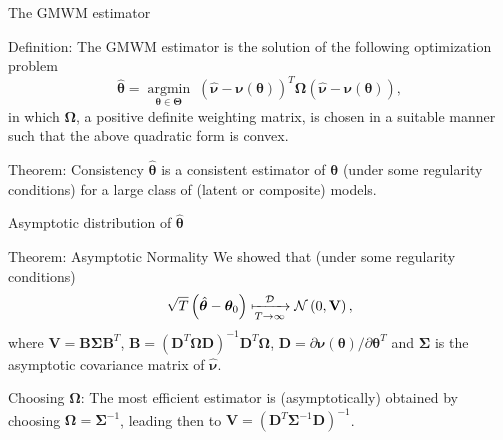 \documentclass[envcountsect,usenames,dvipsnames]{beamer}
\DeclareMathOperator*{\argmin}{argmin}
\theoremstyle{mystyle}
\begin{document}
\begin{frame}{The GMWM estimator}
		\begin{block}{Definition:}
			The GMWM estimator is the solution of the following optimization problem
			\begin{equation*}
			\hat{\bm{\theta}} = \underset{\bm{\theta} \in \bm{\Theta} }{\argmin} \;
			\left(\hat{\bm{\nu}} - \bm{\nu}(\bm{\theta})\right)^{T} \bm{\Omega} \left(\hat{\bm{\nu}} - \bm{\nu}(\bm{\theta})\right),
			\label{eq:indirectEstimator}
			\end{equation*}
			in which $\bm{\Omega}$, a positive definite weighting matrix, is chosen in a suitable manner such that the above quadratic form is convex.
			\end{block}
			
		\begin{alertblock}{Theorem: Consistency}	
			$\hat{\bm{\theta}}$ is a consistent estimator of $\bm{\theta}$ (under some regularity conditions) for a large class of (latent or composite) models.
		\end{alertblock}	
\end{frame}


\begin{frame}{Asymptotic distribution of $\hat{\bm{\theta}}$}
		\begin{alertblock}{Theorem: Asymptotic Normality}	
			We showed that (under some regularity conditions)
			\begin{eqnarray*}
				\sqrt{T}\left(\hat{\bm{\theta}}-{\bm{\theta}}_0 \right) \xmapsto[T\rightarrow\infty]{\mathcal{D}} \mathcal{N}\left(0,\mathbf{V}\right),
			\end{eqnarray*}
			where $\mathbf{V} = \mathbf{B} \bm{\Sigma} \mathbf{B}^T$,	$\mathbf{B} = \left(\mathbf{D}^T \bm{\Omega} \mathbf{D} \right)^{-1} \mathbf{D}^T \bm{\Omega}$, $\mathbf{D} =\partial \bm{\nu}(\bm{\theta}) / \partial \bm{\theta}^T$ and $\bm{\Sigma}$ 
			is the asymptotic covariance matrix of $\hat{\bm{\nu}}$.
		\end{alertblock}
		
		\begin{exampleblock}{Choosing $\bm{\Omega}$:}	
	The most efficient estimator is (asymptotically) obtained by choosing $\bm{\Omega} = \bm{\Sigma}^{-1}$, leading then to  $\mathbf{V} =  (\mathbf{D}^T \bm{\Sigma}^{-1} \mathbf{D})^{-1}$.
		\end{exampleblock}
\end{frame}
\end{document}
